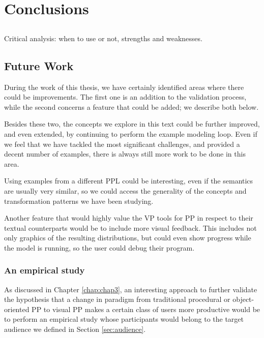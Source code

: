 \chapter{Conclusions} \label{chap:concl}

\section*{}

Critical analysis: when to use or not, strengths and weaknesses.

\section{Future Work}

During the work of this thesis, we have certainly identified areas where there
could be improvements. The first one is an addition to the validation process, while the
second concerns a feature that could be added; we describe both below.

Besides these two, the concepts we explore in this text could be further improved,
and even extended, by continuing to perform the example modeling loop.
Even if we feel that we have tackled the most significant
challenges, and provided a decent number of examples, there is always still more
work to be done in this area.

Using examples from a different PPL could be interesting, even if the semantics
are usually very similar, so we could access the generality of the concepts
and transformation patterns we have been studying.

Another feature that would highly value the VP tools for PP in respect to their
textual counterparts would be to include more visual feedback. This includes
not only graphics of the resulting distributions, but could even show progress
while the model is running, so the user could debug their program.

\subsection{An empirical study}

As discussed in Chapter \ref{chap:chap3}, an interesting approach to further validate
the hypothesis that a change in paradigm from traditional procedural or
object-oriented PP to visual PP makes a certain class of users more productive
would be to perform an empirical study whose participants would belong to the
target audience we defined in Section \ref{sec:audience}.


